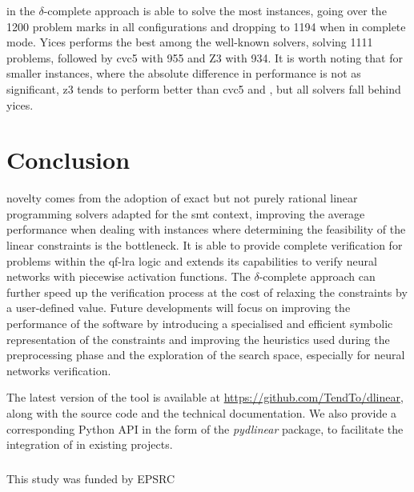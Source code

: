 \documentclass[runningheads]{llncs}
\begin{document}
\dlinear in the $\delta$-complete approach is able to solve the most instances, going over the 1200 problem marks in all configurations and dropping to 1194 when in complete mode.
Yices performs the best among the well-known solvers, solving 1111 problems, followed by cvc5 with 955 and Z3 with 934.
It is worth noting that for smaller instances, where the absolute difference in performance is not as significant, z3 tends to perform better than cvc5 and \dlinear, but all solvers fall behind yices.

\section{Conclusion}

\dlinear novelty comes from the adoption of exact but not purely rational linear programming solvers adapted for the \gls{smt} context, improving the average performance when dealing with instances where determining the feasibility of the linear constraints is the bottleneck.
It is able to provide complete verification for problems within the \gls{qf-lra} logic and extends its capabilities to verify neural networks with piecewise activation functions.
The $\delta$-complete approach can further speed up the verification process at the cost of relaxing the constraints by a user-defined value.
Future developments will focus on improving the performance of the software by introducing a specialised and efficient symbolic representation of the constraints and improving the heuristics used during the preprocessing phase and the exploration of the search space, especially for neural networks verification.

The latest version of the tool is available at \url{https://github.com/TendTo/dlinear}, along with the source code and the technical documentation.
We also provide a corresponding Python API in the form of the \textit{pydlinear} package, to facilitate the integration of \dlinear in existing projects.

\begin{credits}
    \subsubsection{\ackname} This study was funded by EPSRC
\end{credits}



\end{document}
